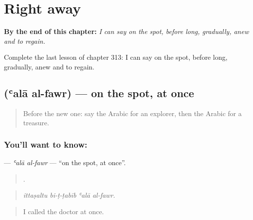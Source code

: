 
\chapter{Right away}
\label{ch:ar-right-away}

\begin{chapteropening}
\textbf{By the end of this chapter:} \emph{I can say on the spot, before long, gradually, anew and to regain.}

Complete the last lesson of chapter 313: I can say on the spot, before long, gradually, anew and to regain.
\end{chapteropening}

\section[\texorpdfstring{\ar{على} \ar{الفور} (ʿalā al-fawr)}{على الفور (ʿalā al-fawr)}]{  (ʿalā al-fawr) — on the spot, at once}

\label{lesson:AR-C313-ala-al-fawr}



\begin{quote}
Before the new one: say the Arabic for an explorer, then the Arabic for a treasure.
\end{quote}

\subsection*{You'll want to know:  }
\textbf{ } — \emph{ʿalā al-fawr} — \textquotedblleft{}on the spot, at once\textquotedblright{}.

\begin{quote}
   .
\end{quote}

\begin{quote}
\emph{ittaṣaltu bi-ṭ-ṭabīb ʿalā al-fawr.}
\end{quote}

\begin{quote}
I called the doctor at once.
\end{quote}

